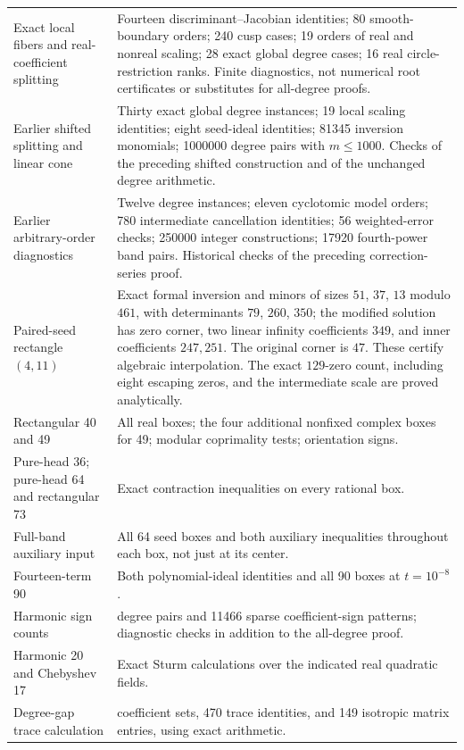\documentclass[UTF8,11pt]{ctexart}
\theoremstyle{definition}
\numberwithin{equation}{section}
\begin{document}
\begin{longtable}{@{}>{\raggedright\arraybackslash}p{}>{\raggedright\arraybackslash}p{}@{}}
Exact local fibers and real-coefficient splitting & Fourteen discriminant--Jacobian identities; 80 smooth-boundary orders; 240 cusp cases; 19 orders of real and nonreal scaling; 28 exact global degree cases; 16 real circle-restriction ranks. Finite diagnostics, not numerical root certificates or substitutes for all-degree proofs. \\
Earlier shifted splitting and linear cone & Thirty exact global degree instances; 19 local scaling identities; eight seed-ideal identities; 81345 inversion monomials; 1000000 degree pairs with $m\le1000$. Checks of the preceding shifted construction and of the unchanged degree arithmetic. \\
Earlier arbitrary-order diagnostics & Twelve degree instances; eleven cyclotomic model orders; 780 intermediate cancellation identities; 56 weighted-error checks; 250000 integer constructions; 17920 fourth-power band pairs. Historical checks of the preceding correction-series proof. \\
Paired-seed rectangle $(4,11)$ & Exact formal inversion and minors of sizes $51$, $37$, $13$ modulo $461$, with determinants $79$, $260$, $350$; the modified solution has zero corner, two linear infinity coefficients $349$, and inner coefficients $247,251$. The original corner is $47$. These certify algebraic interpolation. The exact $129$-zero count, including eight escaping zeros, and the intermediate scale are proved analytically. \\
Rectangular 40 and 49 & All real boxes; the four additional nonfixed complex boxes for 49; modular coprimality tests; orientation signs. \\
Pure-head 36; pure-head 64 and rectangular 73 & Exact contraction inequalities on every rational box. \\
Full-band auxiliary input & All 64 seed boxes and both auxiliary inequalities throughout each box, not just at its center. \\
Fourteen-term 90 & Both polynomial-ideal identities and all 90 boxes at $t=10^{-8}$. \\
Harmonic sign counts & 2016 degree pairs and 11466 sparse coefficient-sign patterns; diagnostic checks in addition to the all-degree proof. \\
Harmonic 20 and Chebyshev 17 & Exact Sturm calculations over the indicated real quadratic fields. \\
Degree-gap trace calculation & 20 coefficient sets, 470 trace identities, and 149 isotropic matrix entries, using exact arithmetic. \\

\end{longtable}
\end{document}
